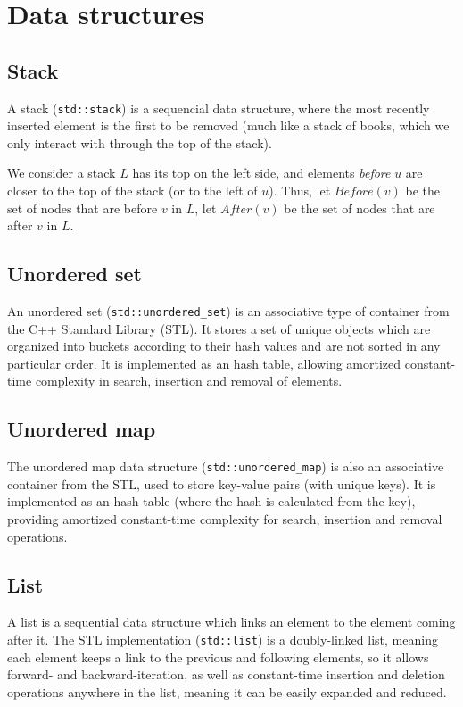 \chapter{Data structures} \label{data-structures}

\section{Stack}
A stack (\texttt{std::stack}) is a sequencial data structure, where the most recently inserted element is the first to be removed (much like a stack of books, which we only interact with through the top of the stack).\par
We consider a stack $L$ has its top on the left side, and elements \emph{before} $u$ are closer to the top of the stack (or to the left of $u$). Thus, let $Before(v)$ be the set of nodes that are before $v$ in $L$, let $After(v)$ be the set of nodes that are after $v$ in $L$.

\section{Unordered set}
An unordered set (\texttt{std::unordered\_set}) is an associative type of container from the C++ Standard Library (STL). It stores a set of unique objects which are organized into buckets according to their hash values and are not sorted in any particular order. It is implemented as an hash table, allowing amortized constant-time complexity in search, insertion and removal of elements.

\section{Unordered map}
The unordered map data structure (\texttt{std::unordered\_map}) is also an associative container from the STL, used to store key-value pairs (with unique keys). It is implemented as an hash table (where the hash is calculated from the key), providing amortized constant-time complexity for search, insertion and removal operations.

\section{List}
A list is a sequential data structure which links an element to the element coming after it. The STL implementation (\texttt{std::list}) is a doubly-linked list, meaning each element keeps a link to the previous and following elements, so it allows forward- and backward-iteration, as well as constant-time insertion and deletion operations anywhere in the list, meaning it can be easily expanded and reduced.

